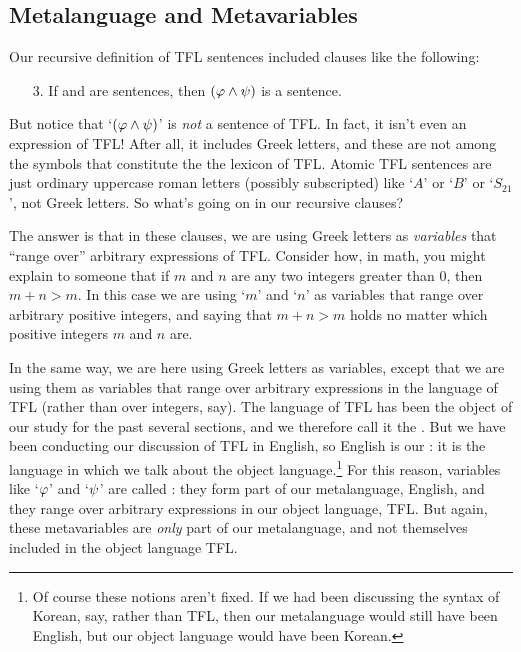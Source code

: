 \subsection{Metalanguage and Metavariables}\label{s:TFLMetavariables}

Our recursive definition of TFL sentences included clauses like the following:
\begin{enumerate}
\item[3.] If \meta{\varphi} and \meta{\psi} are sentences, then $(\mathcal{\varphi}\wedge\mathcal{\psi})$ is a sentence.
\end{enumerate}
But notice that `$(\mathcal{\varphi} \wedge \mathcal{\psi})$' is \emph{not} a sentence of TFL.  In fact, it isn't even an expression of TFL!  After all, it includes Greek letters, and these are not among the symbols that constitute the the lexicon of TFL.  Atomic TFL sentences are just ordinary uppercase roman letters (possibly subscripted) like `$A$' or `$B$' or `$S_{21}$', not Greek letters.  So what's going on in our recursive clauses?

The answer is that in these clauses, we are using Greek letters as \emph{variables} that ``range over'' arbitrary expressions of TFL.  Consider how, in math, you might explain to someone that if $m$ and $n$ are any two integers greater than $0$, then  $m + n > m$.  In this case we are using `$m$' and `$n$' as variables that range over arbitrary positive integers,  and saying that $m + n > m$ holds no matter which positive integers $m$  and $n$ are.  %

In the same way, we are here using Greek letters as variables, except that we are using them as variables that range over arbitrary expressions in the language of TFL (rather than over integers, say).  The language of TFL has been the object of our study for the past several sections, and we therefore call it the .  But we have been conducting our discussion of TFL in English, so English is our : it is the language in which we talk about the object language.\footnote{Of course these notions aren't fixed.  If we had been discussing the syntax of Korean, say, rather than TFL, then our metalanguage would still have been English, but our object language would have been Korean.}
For this reason, variables like `$\mathcal{\varphi}$' and `$\mathcal{\psi}$' are called : they form part of our metalanguage, English, and they range over arbitrary expressions in our object language, TFL.  But again, these metavariables are \emph{only} part of our metalanguage, and not themselves included in the object language TFL.



